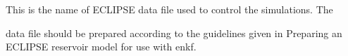 \documentclass[a4paper,10pt,english]{sphinxmanual}
\begin{document}
\label{\detokenize{keywords/index:data-file}}
\begin{sphinxShadowBox}

\begin{DUlineblock}{0em}
\item[] This is the name of ECLIPSE data file used to control the simulations. The
\end{DUlineblock}

data file should be prepared according to the guidelines given in Preparing an
ECLIPSE reservoir model for use with enkf.


%
\begin{sphinxVerbatim}[commandchars=\\\{\}]
      
 
\end{sphinxVerbatim}
\end{sphinxShadowBox}
\label{\detokenize{keywords/index:eclbase}}
\end{document}
